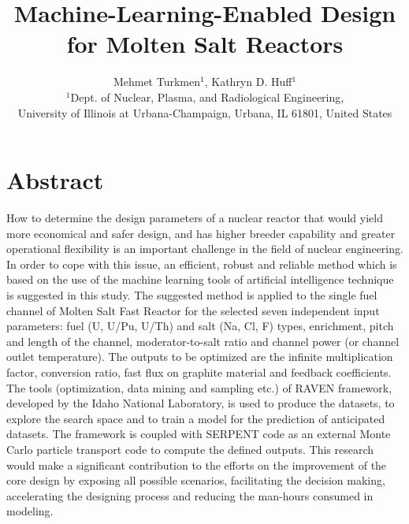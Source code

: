 \documentclass[10pt,a4paper]{article}
\begin{document}
\title{Machine-Learning-Enabled Design for Molten Salt Reactors}
\author{Mehmet Turkmen$^1$, Kathryn D. Huff$^1$\\
$^1$Dept. of Nuclear, Plasma, and Radiological Engineering, \\University of Illinois at Urbana-Champaign, Urbana, IL 61801, United States}

\maketitle


\section*{Abstract}
How to determine the design parameters of a nuclear reactor that would yield 
more economical and safer design, and has higher breeder capability and greater 
operational flexibility is an important challenge in the field of nuclear 
engineering. In order to cope with this issue, an efficient, robust and 
reliable method which is based on the use of the machine learning tools of 
artificial intelligence technique is suggested in this study. The suggested 
method is applied to the single fuel channel of Molten Salt Fast Reactor for 
the selected seven independent input parameters: fuel (U, U/Pu, U/Th) and salt 
(Na, Cl, F) types, enrichment, pitch and length of the channel, 
moderator-to-salt ratio and channel power (or channel outlet temperature). The 
outputs to be optimized are the infinite multiplication factor, conversion 
ratio, fast flux on graphite material and feedback coefficients. The tools 
(optimization, data mining and sampling etc.) of RAVEN framework, developed by 
the Idaho National Laboratory, is used to produce the datasets, to explore the 
search space and to train a model for the prediction of anticipated datasets. 
The framework is coupled with SERPENT code as an external Monte Carlo particle 
transport code to compute the defined outputs. This research would make a 
significant contribution to the efforts on the improvement of the core design 
by exposing all possible scenarios, facilitating the decision making, 
accelerating the designing process and reducing the man-hours consumed in 
modeling.
\end{document}
